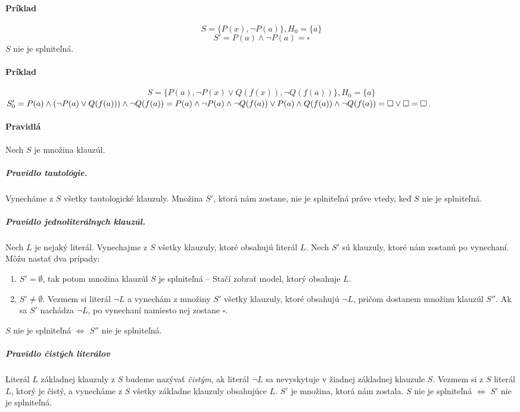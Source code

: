 \paragraph{Príklad}
$$S=\{P(x), \neg P(a)\}, H_0 = \{a\}$$
$$S'=P(a) \land \neg P(a) = \square$$
$S$ nie je splniteľná.

\paragraph{Príklad}
$$S=\{P(a), \neg P(x) \lor Q(f(x)), \neg Q(f(a)) \}, H_0 = \{a\}$$
$ S_0'=P(a) \land (\neg P(a)\lor Q(f(a))) \land \neg Q(f(a)) = \\
P(a)\land \neg P(a) \land \neg Q(f(a)) \lor P(a) \land Q(f(a)) \land \neg Q(f(a)) = 
\\ \square \lor \square = \square$.

\paragraph{Pravidlá}
Nech $S$ je množina klauzúl.

\subparagraph{Pravidlo tautológie.} Vynecháme z $S$ všetky tautologické klauzuly.
Množina $S'$, ktorá nám zostane, nie je splniteľná práve vtedy, keď $S$ nie je
splniteľná.

\subparagraph{Pravidlo jednoliterálnych klauzúl.} Nech $L$ je nejaký literál.
Vynechajme z $S$ všetky klauzuly, ktoré obsahujú literál $L$. Nech $S'$ sú
klauzuly, ktoré nám zostanú po vynechaní. Môžu nastať dva prípady:

\begin{enumerate}
	\item $S' = \emptyset$, tak potom množina klauzúl $S$ je splniteľná --
	Stačí zobrať model, ktorý obsahuje $L$.
	\item $S' \neq \emptyset$. Vezmem si literál $\neg L$ a vynechám z
	množiny $S'$ všetky klauzuly, ktoré obsahujú $\neg L$, pričom dostanem
	množinu klauzúl $S''$. Ak sa $S'$ nachádza $\neg L$, po vynechaní
	namiesto nej zostane $\square$.
\end{enumerate}

$S$ nie je splniteľná $\iff$ $S''$ nie je splniteľná.

\subparagraph{Pravidlo čistých literálov} Literál $L$ základnej klauzuly z $S$
budeme nazývať \emph{čistým}, ak literál $\neg L$ sa nevyskytuje v žiadnej
základnej klauzule $S$. Vezmem si z $S$ literál $L$, ktorý je čistý, a
vynecháme z $S$ všetky základne klauzuly obsahujúce $L$. $S'$ je množina, ktorá
nám zostala. $S$ nie je splniteľná $\iff$ $S'$ nie je splniteľná.

